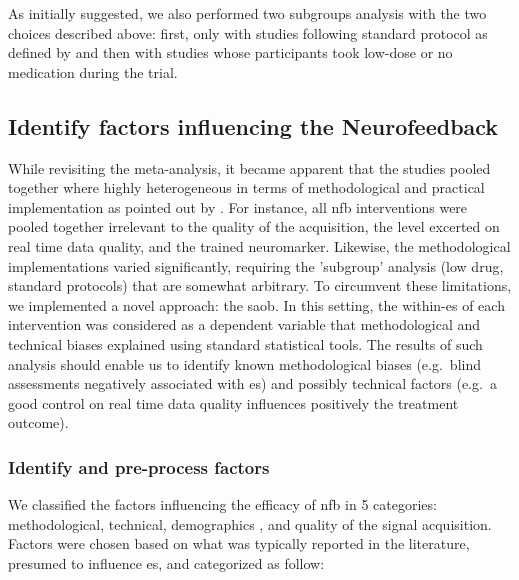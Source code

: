 As initially suggested, we also performed two subgroups analysis with the two choices described above: first, only  with
studies following standard protocol as defined by \citet{Arns2014} and then with studies 
whose participants took low-dose or no medication during the trial.  

\subsection{Identify factors influencing the Neurofeedback}

While revisiting the meta-analysis, it became apparent that the studies pooled together where highly heterogeneous 
in terms of methodological and practical implementation as pointed out by \citet{Alkoby2017}. For instance, all \gls{nfb} interventions were pooled together irrelevant to the 
quality of the acquisition, the level excerted on real time data quality, and the trained neuromarker. 
Likewise, the methodological implementations varied significantly, requiring the 'subgroup' analysis (low drug, standard protocols) 
that are somewhat arbitrary. To circumvent these limitations, we implemented a novel approach: the \gls{saob}. 
In this setting, the within-\gls{es} of each intervention was considered as a dependent variable that
methodological and technical biases explained using standard statistical tools. The results of such analysis should enable us to identify 
known methodological biases (e.g.\ blind assessments negatively associated with \gls{es}) and possibly technical factors (e.g.\ a good control on 
real time data quality influences positively the treatment outcome). 

\subsubsection{Identify and pre-process factors}

We classified the factors influencing the efficacy of \gls{nfb} in 5 categories: methodological, technical,
demographics
, and quality of the signal acquisition. 
Factors were chosen based on what was typically reported in the literature, presumed to influence \gls{es}, and categorized as follow:

